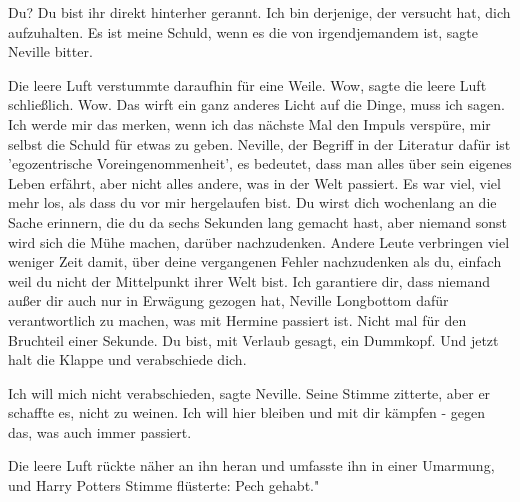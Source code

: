\glqq Du? Du bist ihr direkt hinterher gerannt. Ich bin derjenige, der versucht
hat, dich aufzuhalten. Es ist meine Schuld, wenn es die von irgendjemandem
ist\grqq{}, sagte Neville bitter.

Die leere Luft verstummte daraufhin für eine Weile. \glqq Wow\grqq{}, sagte die
leere Luft schließlich. \glqq Wow. Das wirft ein ganz anderes Licht auf die
Dinge, muss ich sagen. Ich werde mir das merken, wenn ich das nächste Mal den
Impuls verspüre, mir selbst die Schuld für etwas zu geben. Neville, der Begriff
in der Literatur dafür ist 'egozentrische Voreingenommenheit', es bedeutet, dass
man alles über sein eigenes Leben erfährt, aber nicht alles andere, was in der
Welt passiert. Es war viel, viel mehr los, als dass du vor mir hergelaufen bist.
Du wirst dich wochenlang an die Sache erinnern, die du da sechs Sekunden lang
gemacht hast, aber niemand sonst wird sich die Mühe machen, darüber
nachzudenken. Andere Leute verbringen viel weniger Zeit damit, über deine
vergangenen Fehler nachzudenken als du, einfach weil du nicht der Mittelpunkt
ihrer Welt bist. Ich garantiere dir, dass niemand außer dir auch nur in Erwägung
gezogen hat, Neville Longbottom dafür verantwortlich zu machen, was mit Hermine
passiert ist. Nicht mal für den Bruchteil einer Sekunde. Du bist, mit Verlaub
gesagt, ein Dummkopf. Und jetzt halt die Klappe und verabschiede dich.\grqq{}

\glqq Ich will mich nicht verabschieden\grqq{}, sagte Neville. Seine Stimme
zitterte, aber er schaffte es, nicht zu weinen. \glqq Ich will hier bleiben und
mit dir kämpfen - gegen das, was auch immer passiert.\grqq{}

Die leere Luft rückte näher an ihn heran und umfasste ihn in einer Umarmung, und
Harry Potters Stimme flüsterte: \glqq Pech gehabt."

